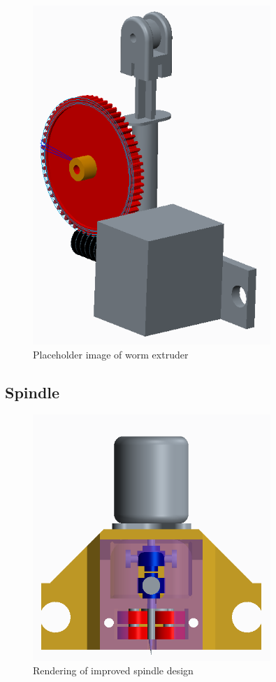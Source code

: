 \begin{figure}[ht!]
\centering
\includegraphics[width=90mm]{resources/extruder_worm.png}
\caption{Placeholder image of worm extruder}
\label{wormextruder}
\end{figure}


\subsection{Spindle}

\begin{figure}[ht!]
\centering
\includegraphics[width=90mm]{resources/spindle.png}
\caption{Rendering of improved spindle design}
\label{spindle}
\end{figure}

